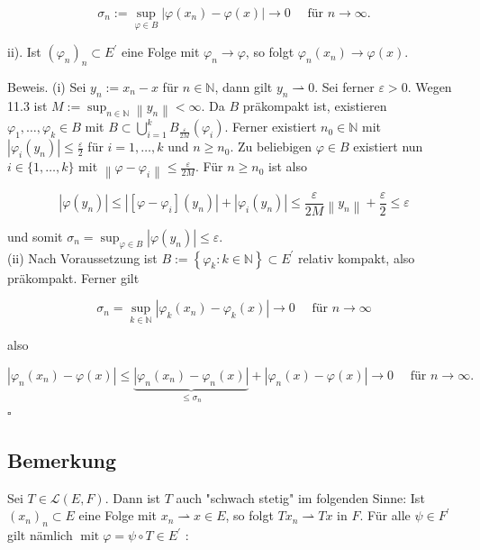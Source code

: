 \documentclass[10pt, letterpaper]{article}
\begin{document}
$$
\sigma_{n}:=\sup _{\varphi \in B}\left|\varphi\left(x_{n}\right)-\varphi(x)\right| \rightarrow 0 \quad \text { für } n \rightarrow \infty .
$$

ii). Ist $\left(\varphi_{n}\right)_{n} \subset E^{\prime}$ eine Folge mit $\varphi_{n} \rightarrow \varphi$, so folgt $\varphi_{n}\left(x_{n}\right) \rightarrow \varphi(x)$.

Beweis. (i) Sei $y_{n}:=x_{n}-x$ für $n \in \mathbb{N}$, dann gilt $y_{n} \rightharpoonup 0$. Sei ferner $\varepsilon>0$. Wegen 11.3 ist $M:=\sup _{n \in \mathbb{N}}\left\|y_{n}\right\|<\infty$. Da $B$ präkompakt ist, existieren $\varphi_{1}, \ldots, \varphi_{k} \in B$ mit $B \subset \bigcup_{i=1}^{k} B_{\frac{\varepsilon}{2 M}}\left(\varphi_{i}\right)$. Ferner existiert $n_{0} \in \mathbb{N}$ mit $\left|\varphi_{i}\left(y_{n}\right)\right| \leq \frac{\varepsilon}{2}$ für $i=1, \ldots, k$ und $n \geq n_{0}$. Zu beliebigen $\varphi \in B$ existiert nun $i \in\{1, \ldots, k\}$ mit $\left\|\varphi-\varphi_{i}\right\| \leq \frac{\varepsilon}{2 M}$. Für $n \geq n_{0}$ ist also

$$
\left|\varphi\left(y_{n}\right)\right| \leq\left|\left[\varphi-\varphi_{i}\right]\left(y_{n}\right)\right|+\left|\varphi_{i}\left(y_{n}\right)\right| \leq \frac{\varepsilon}{2 M}\left\|y_{n}\right\|+\frac{\varepsilon}{2} \leq \varepsilon
$$

und somit $\sigma_{n}=\sup _{\varphi \in B}\left|\varphi\left(y_{n}\right)\right| \leq \varepsilon$.\\
(ii) Nach Voraussetzung ist $B:=\left\{\varphi_{k}: k \in \mathbb{N}\right\} \subset E^{\prime}$ relativ kompakt, also präkompakt. Ferner gilt

$$
\sigma_{n}=\sup _{k \in \mathbb{N}}\left|\varphi_{k}\left(x_{n}\right)-\varphi_{k}(x)\right| \rightarrow 0 \quad \text { für } n \rightarrow \infty
$$

also

$$
\left|\varphi_{n}\left(x_{n}\right)-\varphi(x)\right| \leq \underbrace{\left|\varphi_{n}\left(x_{n}\right)-\varphi_{n}(x)\right|}_{\leq \sigma_{n}}+\left|\varphi_{n}(x)-\varphi(x)\right| \rightarrow 0 \quad \text { für } n \rightarrow \infty .
$$ \(\square\)

\subsection*{Bemerkung}
Sei $T \in \mathcal{L}(E, F)$. Dann ist $T$ auch "schwach stetig" im folgenden Sinne: Ist $\left(x_{n}\right)_{n} \subset E$ eine Folge mit $x_{n} \rightharpoonup x \in E$, so folgt $T x_{n} \rightharpoonup T x$ in $F$. Für alle $\psi \in F^{\prime}$ gilt nämlich $\operatorname{mit} \varphi=\psi \circ T \in E^{\prime}$ :
\end{document}
